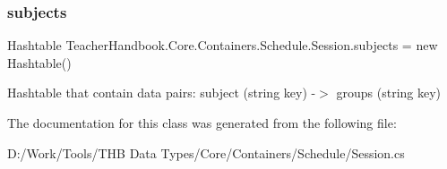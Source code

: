 \subsubsection{\texorpdfstring{subjects}{subjects}}
{\footnotesize\ttfamily Hashtable Teacher\+Handbook.\+Core.\+Containers.\+Schedule.\+Session.\+subjects = new Hashtable()}



Hashtable that contain data pairs\+: subject (string key) -\/$>$ groups (string key) 



The documentation for this class was generated from the following file\+:\begin{DoxyCompactItemize}
\item 
D\+:/\+Work/\+Tools/\+T\+H\+B Data Types/\+Core/\+Containers/\+Schedule/Session.\+cs\end{DoxyCompactItemize}
